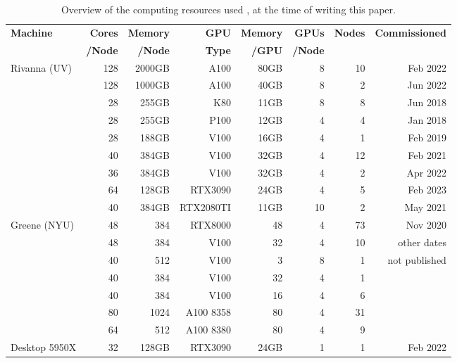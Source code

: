 \documentclass[sigplan,screen]{acmart}
\begin{document}
\begin{table}[htb]
    \caption{Overview of the computing resources used \cite{las23-cloudmask}, at the time of writing this paper.}
    \label{tab:hwoverview}
    \begin{center}
    \begin{tabular}{|l|r|r|r|r|r|r|r|}
        \hline
            {\bf Machine}  & {\bf Cores} & {\bf Memory} & {\bf GPU}   &   {\bf Memory} & {\bf GPUs} & {\bf Nodes}  & {\bf Commissioned} \\ 
                     &  {\bf /Node} & {\bf /Node}  &  {\bf Type}  & {\bf /GPU}     &   {\bf /Node}        & & \\
        \hline
        \hline
        Rivanna (UV)    & 128 & 2000GB   & A100 & 80GB &  8  & 10 & Feb 2022 \\
                        & 128 & 1000GB   & A100 & 40GB &  8  &  2 & Jun 2022 \\   
                        & 28  & 255GB    & K80  & 11GB &  8  &  8 & Jun 2018 \\
                        & 28  & 255GB    & P100 & 12GB &  4  &  4 & Jan 2018 \\
                        & 28  & 188GB    & V100 & 16GB &  4  &  1 & Feb 2019 \\
                        & 40  & 384GB    & V100 & 32GB &  4  & 12 & Feb 2021 \\
                        & 36  & 384GB    & V100 & 32GB &  4  &  2 & Apr 2022 \\
                        &  64 & 128GB     & RTX3090   & 24GB    & 4   &  5 & Feb 2023         \\
                        & 40  & 384GB    & RTX2080TI & 11GB & 10  &  2 & May 2021 \\
         \hline
         Greene (NYU)	& 48	& 384	& RTX8000 	& 48	& 4	& 73 & Nov 2020\\
	        & 48	& 384	& V100 	    & 32	& 4	& 10 & other dates \\
	        & 40	& 512	& V100 	    & 3     & 8 & 1  & not published \\
	        & 40	& 384	& V100 	    & 32    & 4	& 1  & \\
	        & 40	& 384	& V100 	    & 16    & 4	& 6  & \\
	        & 80	& 1024	& A100  8358	& 80    & 4 & 31 & \\
	        & 64	& 512	& A100  8380	& 80    & 4 & 9  & \\

         \hline
         Desktop 5950X     &  32 & 128GB     & RTX3090   & 24GB    & 1 & 1 & Feb 2022   \\
         \hline
    \end{tabular}
    \end{center}

\end{table}
\end{document}
